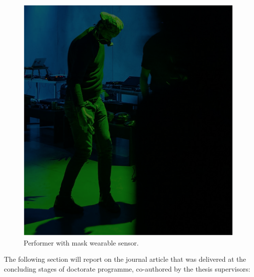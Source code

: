 \label{case_studies:adse_ess}

\begin{figure}[!h]
\captionsetup{width=1.0\textwidth}
\centering
\includegraphics[width=0.6
\textwidth,keepaspectratio]{Chapters/Figures/adse_ess/CSL_MASK_MICK.png}
{\caption{Performer with mask wearable sensor.
}\label{fig:sensor_model}}
\end{figure}

The following section will report on the journal article that was delivered at the concluding stages of doctorate programme, co-authored by the thesis supervisors:


